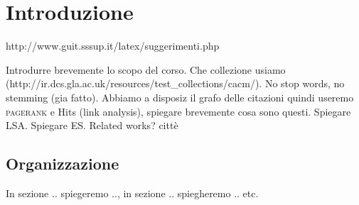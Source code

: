 \section{Introduzione}
\label{sec:introduzione}

http://www.guit.sssup.it/latex/suggerimenti.php

Introdurre brevemente lo scopo del corso. Che collezione usiamo (http://ir.dcs.gla.ac.uk/resources/test\_collections/cacm/). No stop words, no stemming (gia fatto). 
Abbiamo a disposiz il grafo delle citazioni quindi useremo \textsc{pagerank} e Hits (link analysis), spiegare brevemente cosa sono questi. Spiegare LSA. Spiegare ES. Related works?  citt\`e
\subsection{Organizzazione}
In sezione .. spiegeremo .., in sezione .. spiegheremo .. etc.

%
